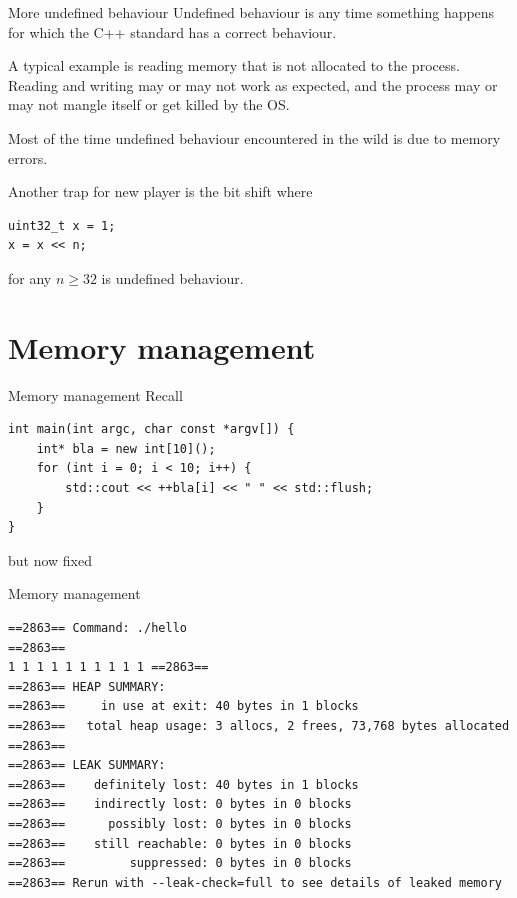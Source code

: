 \documentclass[11pt, aspectratio=169, table]{beamer}
\begin{document}
\begin{frame}[fragile]{More undefined behaviour}
\setlength\parskip{2pt}
Undefined behaviour is any time something happens for which the C++ standard has a correct behaviour.

A typical example is reading memory that is not allocated to the process. Reading and writing may or 
may not work as expected, and the process may or may not mangle itself or get killed by the OS.

Most of the time undefined behaviour encountered in the wild is due to memory errors. 

Another trap for new player is the bit shift where 

\vspace{-0.3cm}\begin{verbatim}
uint32_t x = 1;
x = x << n;
\end{verbatim}

\vspace{-0.5cm}for any $n \geq 32$ is undefined behaviour.
\end{frame}

\section{Memory management}
\begin{frame}[fragile]{Memory management}
Recall

\begin{verbatim}
int main(int argc, char const *argv[]) {
    int* bla = new int[10]();
    for (int i = 0; i < 10; i++) {
        std::cout << ++bla[i] << " " << std::flush;
    }
}
\end{verbatim}

but now fixed
\end{frame}

\begin{frame}[fragile]{Memory management}
\vspace{-0.5cm}
\begin{verbatim}
==2863== Command: ./hello
==2863==
1 1 1 1 1 1 1 1 1 1 ==2863==
==2863== HEAP SUMMARY:
==2863==     in use at exit: 40 bytes in 1 blocks
==2863==   total heap usage: 3 allocs, 2 frees, 73,768 bytes allocated
==2863==
==2863== LEAK SUMMARY:
==2863==    definitely lost: 40 bytes in 1 blocks
==2863==    indirectly lost: 0 bytes in 0 blocks
==2863==      possibly lost: 0 bytes in 0 blocks
==2863==    still reachable: 0 bytes in 0 blocks
==2863==         suppressed: 0 bytes in 0 blocks
==2863== Rerun with --leak-check=full to see details of leaked memory
\end{verbatim}
\end{frame}
\end{document}
